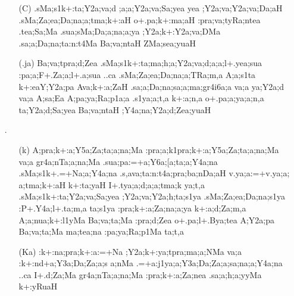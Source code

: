 \begin{itemize} 
\item[]		 \begin{itemize}         
          \item[({\sktf C})] {\sktf .sMa;s1k+:ta;Y2a;va;d%
;a;a;Y2a;va;Sa;yea yea ;Y2a;va;Y2a;va;Da;aH
.sMa;Za;ea;Da;na;a;tma;k+:aH o+.pa;k+:ma;aH
:pra;va;tyRa;ntea\ZF{,} .tea;Sa;Ma .sua;sMa;Da;a;na;a;ya ;Y2a;k+:Y2a;va;DMa .sa;a;Da;na;ta:n:t4Ma
Ba;va;ntaH ZMa;sea;yuaH}
          
          \item[({\sktf .ja})] {\sktf Ba;va;tpra;d;Zea
.sMa;s1k+:ta;ma;h;a;Y2a;va;d;a;a;l+.yea;sua
:pa;a;F+.Za;a;l+.a;sua ..ca .sMa;Za;ea;Da;na;a;TRa;m,a
A;a;s1ta k+:eaY;Y2a;pa Ava;k+:a;ZaH .sa;a;Da;na;sa;a;ma;gr4i6a;a va;a  ya;Y2a;d va;a
A;sa;Ea A;pa;ya;Ra;p1a;a .s1ya;a;t,a\ZF{,} k+:a;n,a o+.pa;a;ya;a;n,a
ta;Y2a;d;Sa;yea Ba;va;ntaH ;Y4a;na;Y2a;d;Zea;yuaH%
}
          
         \end{itemize}


\item[{\sktf 24}.] \begin{itemize}
           
          \item[({\sktf k})] {\sktf A;pra;k+:a;Y5a;Za;ta;a;na;Ma
:pra;a;k1pra;k+:a;Y5a;Za;ta;a;na;Ma va;a gr4a;nTa;a;na;Ma
.sua;pa:=+a;Y6a;[a;ta;a;Y4a;na .sMa;s1k+.=+Na;a;Y4a;na\ZF{,} .s,ava;ta:n:t4a;pra;ba;nDa;aH\ZF{,} v.ya;a:=+v.ya;a;%
a;tma;k+:aH} {\sktf k+:ta;yaH%
\ZF{-}I+.tya;a;d;a;a;tma;k ya;t,a} {\sktf
.sMa;s1k+:ta;Y2a;va;Sa;yea ;Y2a;va;Y2a;h;ta;s1ya
.sMa;Za;ea;Da;na;s1ya :P+.Y4a;l+.ta;m,a\ZF{,} ta;s1ya :pra;k+:a;Za;na;a;ya
k+:a;d;Za;m,a A;a;nua;k+:l1yMa
Ba;va;ta;Ma :pra;d;Zea o+.pa;l+.Bya;tea  A;Y2a;pa Ba;va;ta;Ma
ma;tea;na :pa;ya;Ra;p1Ma ta;t,a} 
           
          \item[({\sktf Ka})] {\sktf :k+:na;pra;k+:a:=+Na
;Y2a;k+:ya;tpra;ma;a;NMa va;a :k+:nd+a;Y3a;Da;Za;a;s%
a;nMa .=+a:j1ya;a;Y3a;Da;Za;a;sa;na;a;Y4a;na ..ca I+.d;Za;Ma gr4a;nTa;a;na;Ma :pra;k+:a;Za;nea .sa;a;h;a;yyMa k+:yRuaH%
} 
          

\end{itemize}
\end{itemize}
